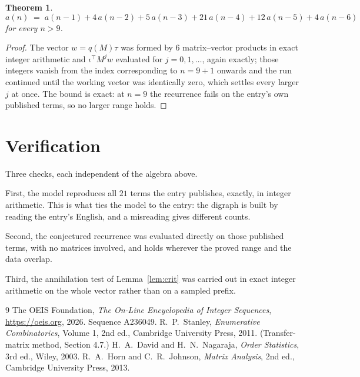 \documentclass[11pt,a4paper]{article}
\theoremstyle{plain}
\newtheorem{theorem}{Theorem}
\theoremstyle{definition}
\begin{document}
\begin{theorem}
\[
a(n)\;=\;a(n-1) + 4\,a(n-2) + 5\,a(n-3) + 21\,a(n-4) + 12\,a(n-5) + 4\,a(n-6)
\]
for every $n>9$.
\end{theorem}

\begin{proof}
The vector $w=q(M)\tau$ was formed by $6$ matrix--vector products in exact integer
arithmetic and $\iota^{\!\top}M^{j}w$ evaluated for $j=0,1,\dots$, again exactly; those
integers vanish from the index corresponding to $n=9+1$ onwards and the run continued
until the working vector was identically zero, which settles every larger $j$ at once. The bound is exact: at $n=9$ the recurrence fails on the entry's own published terms, so no larger range holds.
\end{proof}

\section{Verification}

Three checks, each independent of the algebra above.

First, the model reproduces all $21$ terms the entry publishes, exactly, in integer
arithmetic. This is what ties the model to the entry: the digraph is built by reading the
entry's English, and a misreading gives different counts.

Second, the conjectured recurrence was evaluated directly on those published terms, with no
matrices involved, and holds wherever the proved range and the data overlap.

Third, the annihilation test of Lemma~\ref{lem:crit} was carried out in exact integer
arithmetic on the whole vector rather than on a sampled prefix.

\begin{thebibliography}{9}
 The OEIS Foundation, \emph{The On-Line Encyclopedia of Integer
Sequences}, \url{https://oeis.org}, 2026. Sequence A236049.
 R.~P.~Stanley, \emph{Enumerative Combinatorics}, Volume 1, 2nd ed.,
Cambridge University Press, 2011. (Transfer-matrix method, Section 4.7.)
 H.~A.~David and H.~N.~Nagaraja, \emph{Order Statistics}, 3rd ed., Wiley,
2003.
 R.~A.~Horn and C.~R.~Johnson, \emph{Matrix Analysis}, 2nd ed., Cambridge
University Press, 2013.
\end{thebibliography}
\end{document}
